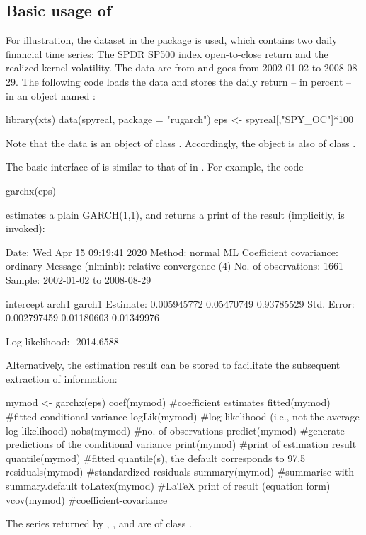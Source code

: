 \subsection{Basic usage of  }

For illustration, the  dataset in the  package is used, which contains two daily financial time series: The SPDR SP500 index open-to-close return and the realized kernel volatility. The data are from \citet{HansenHuangSchek2012} and goes from 2002-01-02 to 2008-08-29. The following code loads the data and stores the daily return -- in percent -- in an object named :
%
\begin{example}
	library(xts)
	data(spyreal, package = "rugarch")
	eps <- spyreal[,"SPY_OC"]*100
\end{example}
%
Note that the data  is an object of class  \citep{RyanUlrich2020}. Accordingly, the object  is also of class .

The basic interface of  is similar to that of  in . For example, the code
%
\begin{example}
	garchx(eps)
\end{example}
%
estimates a plain GARCH(1,1), and returns a print of the result (implicitly,  is invoked):
%
\begin{example}
	Date: Wed Apr 15 09:19:41 2020 
	Method: normal ML
	Coefficient covariance: ordinary 
	Message (nlminb): relative convergence (4) 
	No. of observations: 1661 
	Sample: 2002-01-02 to 2008-08-29 
	
	              intercept      arch1     garch1
	Estimate:   0.005945772 0.05470749 0.93785529
	Std. Error: 0.002797459 0.01180603 0.01349976
	
	Log-likelihood: -2014.6588
\end{example}
% 
Alternatively, the estimation result can be stored to facilitate the subsequent extraction of information:
%
\begin{example}
	mymod <- garchx(eps)
	coef(mymod)       #coefficient estimates
	fitted(mymod)     #fitted conditional variance
	logLik(mymod)     #log-likelihood (i.e., not the average log-likelihood)
	nobs(mymod)       #no. of observations
	predict(mymod)    #generate predictions of the conditional variance
	print(mymod)      #print of estimation result
	quantile(mymod)   #fitted quantile(s), the default corresponds to 97.5%
	residuals(mymod)  #standardized residuals
	summary(mymod)    #summarise with summary.default
	toLatex(mymod)    #LaTeX print of result (equation form)
	vcov(mymod)       #coefficient-covariance
\end{example}
%
The series returned by , , and  are of class  \citep{ZeileisGrothendieck2005}.

